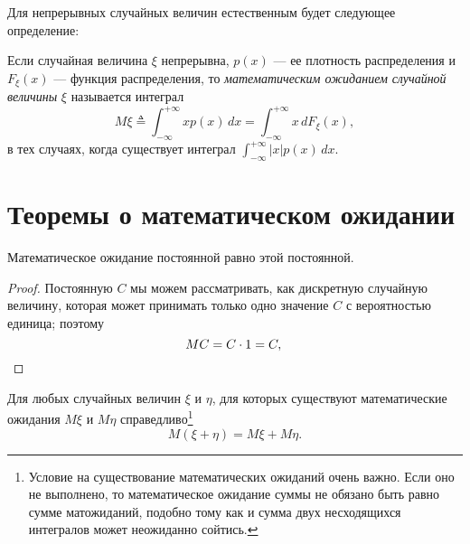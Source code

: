 Для непрерывных случайных величин естественным будет следующее определение: 
\begin{defn} 
Если случайная величина $\xi$ непрерывна, $p(x)$ --- ее плотность распределения и $F_\xi(x)$ --- функция распределения,  то \textit{математическим ожиданием} \textit{случайной величины} $\xi$ называется интеграл
\begin{equation}
M\xi\triangleq\int_{-\infty}^{+\infty} xp(x)\,dx = \int_{-\infty}^{+\infty} x\,dF_\xi(x),
\end{equation}
в тех случаях, когда существует интеграл $\int_{-\infty}^{+\infty} |x|p(x)\,dx.$ 
\end{defn}



\section{Теоремы о математическом ожидании}
\begin{thm}\label{ch31.3thm1}
Математическое ожидание постоянной равно этой постоянной.
\end{thm}
\begin{proof}
Постоянную $C$ мы можем рассматривать, как дискретную случайную величину, которая может принимать только одно значение $C$ с вероятностью единица; поэтому
\begin{equation*}
M C = C\cdot1=C, \qedhere
\end{equation*}
\end{proof}
\begin{thm}\label{ch31.2t1}
Для любых случайных величин $\xi$ и $\eta$, для которых существуют математические ожидания $M\xi$ и $M\eta$ справедливо\footnote{Условие на существование математических ожиданий очень важно. Если оно не выполнено, то математическое ожидание суммы не обязано быть равно сумме матожиданий, подобно тому как и сумма двух несходящихся интегралов может неожиданно сойтись.}
\begin{equation}
M(\xi+\eta) = M\xi+M\eta.
\end{equation}
\end{thm}

